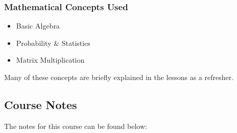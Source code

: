 {\begin{highlight}[\CSPBCogSci]
        \subsubsection*{Mathematical Concepts Used}
        
        \begin{itemize}
            \item Basic Algebra
            \item Probability \& Statistics
            \item Matrix Multiplication
        \end{itemize}
        Many of these concepts are briefly explained in the lessons as a refresher.
    \end{highlight}
}

\subsection{Course Notes}

The notes for this course can be found below: \coursedoc{\CSPBCogSciCourseNotes}





